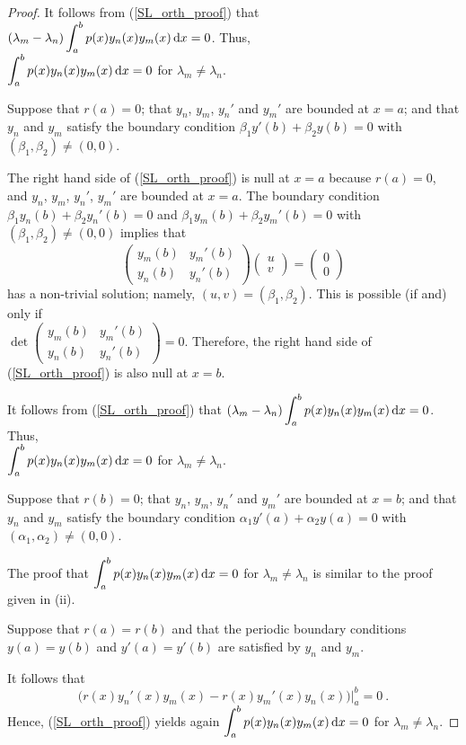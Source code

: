 \begin{proof}
It follows from (\ref{SL_orth_proof}) that
$\displaystyle (\lambda_m - \lambda_n) \int_a^b p(x) y_n(x) y_m(x) \,\mathrm{d}{x} = 0$.
Thus,\\
$\displaystyle \int_a^b p(x) y_n(x) y_m(x) \,\mathrm{d}{x} = 0$ for
$\lambda_m \neq \lambda_n$.

 Suppose that $r(a)=0$; that $y_n$, $y_m$, $y_n'$ and $y_m'$ are
bounded at $x=a$; and that $y_n$ and $y_m$ satisfy the boundary
condition $\beta_1 y'(b) + \beta_2 y(b) = 0$ with
$(\beta_1,\beta_2) \neq (0,0)$.

The right hand side of (\ref{SL_orth_proof}) is null at $x=a$ because
$r(a)=0$, and $y_n$, $y_m$, $y_n'$, $y_m'$ are bounded at $x=a$.
The boundary condition
$\displaystyle \beta_1 y_n(b) + \beta_2 y_n'(b) = 0$ and
$\displaystyle \beta_1 y_m(b) + \beta_2 y_m'(b) = 0$
with $(\beta_1,\beta_2)\neq (0,0)$ implies that
\[
\begin{pmatrix} y_m(b) & y_m'(b) \\ y_n(b) & y_n'(b) \end{pmatrix}
\begin{pmatrix} u \\ v \end{pmatrix}
= \begin{pmatrix} 0 \\ 0 \end{pmatrix}
\]
has a non-trivial solution; namely, $(u,v) = (\beta_1,\beta_2)$.  This is
possible (if and) only if\\
$\displaystyle
\det \begin{pmatrix} y_m(b) & y_m'(b) \\ y_n(b) & y_n'(b) \end{pmatrix} = 0$.
Therefore, the right hand side of (\ref{SL_orth_proof}) is also null at
$x=b$.

It follows from (\ref{SL_orth_proof}) that
$\displaystyle (\lambda_m - \lambda_n) \int_a^b p(x) y_n(x) y_m(x) \,\mathrm{d}{x} = 0$.
Thus,\\
$\displaystyle \int_a^b p(x) y_n(x) y_m(x) \,\mathrm{d}{x} = 0$ for
$\lambda_m \neq \lambda_n$.

 Suppose that $r(b)=0$; that $y_n$, $y_m$, $y_n'$ and $y_m'$
are bounded at $x=b$; and that $y_n$ and $y_m$ satisfy the boundary
condition $\alpha_1 y'(a) + \alpha_2 y(a) = 0$ with
$(\alpha_1,\alpha_2) \neq (0,0)$.

The proof that $\displaystyle \int_a^b p(x) y_n(x) y_m(x) \,\mathrm{d}{x} = 0$ for
$\lambda_m \neq \lambda_n$ is similar to the proof given in (ii).

 Suppose that $r(a) = r(b)$ and that the periodic
boundary conditions $y(a) = y(b)$ and $y'(a) = y'(b)$ are satisfied by $y_n$
and $y_m$.

It follows that
\[
\big(r(x) y_n'(x)y_m(x) - r(x) y_m'(x)y_n(x)\big)\Big|_a^b = 0 \ .
\]
Hence, (\ref{SL_orth_proof}) yields again
$\displaystyle \int_a^b p(x) y_n(x) y_m(x) \,\mathrm{d}{x} = 0$ for
$\lambda_m \neq \lambda_n$.
\end{proof}

